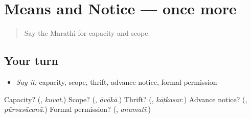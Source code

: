 \section[(dialogue)]{Means and Notice — once more}

\label{lesson:MR-R557-review-final-557}



\begin{quote}
Say the Marathi for capacity and scope.
\end{quote}

\subsection*{Your turn}
\begin{itemize}
\raggedright
  \item \emph{Say it:} capacity, scope, thrift, advance notice, formal permission
\end{itemize}

\begin{tcolorbox}[breakable,colback=teal!4,colframe=teal!35!black,title={Before you move on}]
Capacity? (\textbf{}, \emph{kuvat}.) Scope? (\textbf{}, \emph{āvākā}.) Thrift? (\textbf{}, \emph{kāṭkasar}.) Advance notice? (\textbf{}, \emph{pūrvasūcanā}.) Formal permission? (\textbf{}, \emph{anumatī}.)
\end{tcolorbox}
